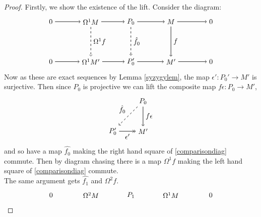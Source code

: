\documentclass[11.5pt, twoside, a4paper, titlepage]{report}
\theoremstyle{definition}
\theoremstyle{plain}
\begin{document}
\begin{proof}
Firstly, we show the existence of the lift. Consider the diagram:
\begin{equation} \label{comparisondiag}
\begin{tikzpicture}[->,-latex, auto, main path/.style={->, semithick}, main node/.style={}]
\node	[main node]		(2) at (2,0)		{$0$};
\node	[main node]		(3) at (4,0)		{$\Omega^1M$};
\node [main node]		(4) at (6,0)		{$P_0$};
\node [main node]		(5) at (8,0)		{$M$};
\node	[main node]		(11) at (10,0)	{$0$};

\node	[main node]		(7) at (2,-2)		{$0$};
\node	[main node]		(8) at (4,-2)		{$\Omega^1M'$};
\node [main node]		(9) at (6,-2)		{$P'_0$};
\node [main node]		(10) at (8,-2)	{$M'$};
\node [main node]		(13) at (10,-2)	{$0$};

\draw (2) edge [main path] node [auto] {$$} (3);
\draw (3) edge [main path] node [auto] {$$} (4);
\draw (4) edge [main path] node [auto] {$$} (5);
\draw (5) edge [main path] (11);

\draw (7) edge [main path] node [auto] {$$} (8);
\path (8) edge [main path] node [auto] {$$} (9);
\draw (9) edge [main path] node [auto, swap] {$$} (10);
\draw (10) edge [main path] (13);

\draw (3) edge [dashed, ->, semithick] node [auto] {$\Omega^1f$} (8);
\draw (4) edge [dashed, ->, semithick] node [auto] {$\hat{f_0}$} (9);
\draw (5) edge [main path] node [auto] {$f$} (10);
\end{tikzpicture}
\end{equation}
Now as these are exact sequences by Lemma \ref{syzygylem}, the map $\epsilon': P_0' \to M'$ is surjective. Then since $P_0$ is projective we can lift the composite map $f\epsilon: P_0 \to M'$,
\begin{equation*}
\begin{tikzpicture}[->,-latex, auto, main path/.style={->, semithick}, main node/.style={}]
\node [main node]		(1) at (1.5,1.5)		{$P_0$};
\node [main node]		(2) at (0,0)		{$P'_0$};
\node [main node]		(3) at (1.5,0)		{$M'$};

\draw (1) edge [main path] node [auto] {$f\epsilon$} (3);
\draw (1) edge [dashed, ->, semithick] node [auto, swap] {$\hat{f_0}$} (2);
\draw (2) edge [->>, semithick] node [auto, swap] {$\epsilon'$} (3);
\end{tikzpicture}
\end{equation*}
and so have a map $\hat{f_0}$ making the right hand square of \ref{comparisondiag} commute. Then by diagram chasing there is a map $\Omega^1f$ making the left hand square of \ref{comparisondiag} commute.\\
The same argument gets $\hat{f_1}$ and $\Omega^2f$.
\begin{equation*} 
\begin{tikzpicture}[->,-latex, auto, main path/.style={->, semithick}, main node/.style={}]
\node	[main node]		(2) at (2,0)		{$0$};
\node	[main node]		(3) at (4,0)		{$\Omega^2M$};
\node [main node]		(4) at (6,0)		{$P_1$};
\node [main node]		(5) at (8,0)		{$\Omega^1M$};
\node	[main node]		(11) at (10,0)	{$0$};


\end{tikzpicture}
\end{equation*}
\end{proof}
\end{document}

